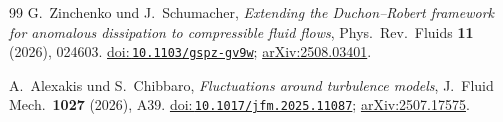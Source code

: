 \documentclass[12pt,a4paper]{article}
\newcommand{\doilink}[1]{\href{https://doi.org/#1}{doi:\,\nolinkurl{#1}}}
\theoremstyle{breakdef}
\theoremstyle{breakplain}
\theoremstyle{breakdef}
\begin{document}
\begin{thebibliography}{99}
G.~Zinchenko und J.~Schumacher,
\emph{Extending the Duchon--Robert framework for anomalous dissipation to compressible fluid flows},
Phys.\ Rev.\ Fluids \textbf{11} (2026), 024603.
\doilink{10.1103/gspz-gv9w};
\href{https://arxiv.org/abs/2508.03401}{arXiv:2508.03401}.

A.~Alexakis und S.~Chibbaro,
\emph{Fluctuations around turbulence models},
J.~Fluid Mech.\ \textbf{1027} (2026), A39.
\doilink{10.1017/jfm.2025.11087};
\href{https://arxiv.org/abs/2507.17575}{arXiv:2507.17575}.

\end{thebibliography}
\end{document}
